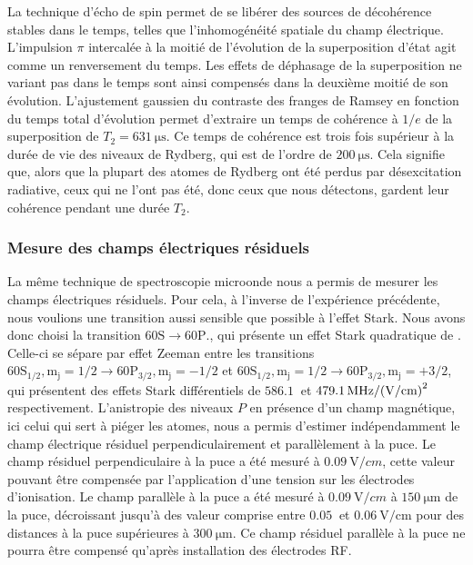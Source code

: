 \newpage
La technique d'écho de spin permet de se libérer des sources de décohérence stables dans le temps, telles que l'inhomogénéité spatiale du champ électrique.
L'impulsion $\pi$ intercalée à la moitié de l'évolution de la superposition d'état agit comme un renversement du temps.
Les effets de déphasage de la superposition ne variant pas dans le temps sont ainsi compensés dans la deuxième moitié de son évolution.
L'ajustement gaussien du contraste des franges de Ramsey en fonction du temps total d'évolution permet d'extraire un temps de cohérence à $1/e$ de la superposition de $T_2 = \SI{631}{\us}$.
Ce temps de cohérence est trois fois supérieur à la durée de vie des niveaux de Rydberg, qui est de l'ordre de $\SI{200}{\us}$.
Cela signifie que, alors que la plupart des atomes de Rydberg ont été perdus par désexcitation radiative, ceux qui ne l'ont pas été, donc ceux que nous détectons, gardent leur cohérence pendant une durée $T_2$.

\subsubsection*{Mesure des champs électriques résiduels}
\noindent La même technique de spectroscopie microonde nous a permis de mesurer les champs électriques résiduels.
Pour cela, à l'inverse de l'expérience précédente, nous voulions une transition aussi sensible que possible à l'effet Stark.
Nous avons donc choisi la transition $\mathrm{60S}\rightarrow\mathrm{60P}$., qui présente un effet Stark quadratique de .
Celle-ci se sépare par effet Zeeman entre les transitions $\mathrm{60S_{1/2},m_j=1/2} \rightarrow \mathrm{60P_{3/2},m_j=-1/2}$ %
et $\mathrm{60S_{1/2},m_j=1/2} \rightarrow \mathrm{60P_{3/2},m_j=+3/2}$, qui présentent des effets Stark différentiels de $\SI{586.1}{}$ et $\SI{479.1}{\MHz \per (\V \per\cm) \squared}$ respectivement.
L'anistropie des niveaux $P$ en présence d'un champ magnétique, ici celui qui sert à piéger les atomes, nous a permis d'estimer indépendamment le champ électrique résiduel perpendiculairement et parallèlement à la puce.
Le champ résiduel perpendiculaire à la puce a été mesuré à $\SI{0.09}{\V/cm}$, cette valeur pouvant être compensée par l'application d'une tension sur les électrodes d'ionisation.
Le champ parallèle à la puce a été mesuré à $\SI{0.09}{\V/cm}$ à $\SI{150}{\um}$ de la puce, décroissant jusqu'à des valeur comprise entre $\SI{0.05}{}$ et $\SI{0.06}{\V/\cm}$ pour des distances à la puce supérieures à $\SI{300}{\um}$.
Ce champ résiduel parallèle à la puce ne pourra être compensé qu'après installation des électrodes RF.

